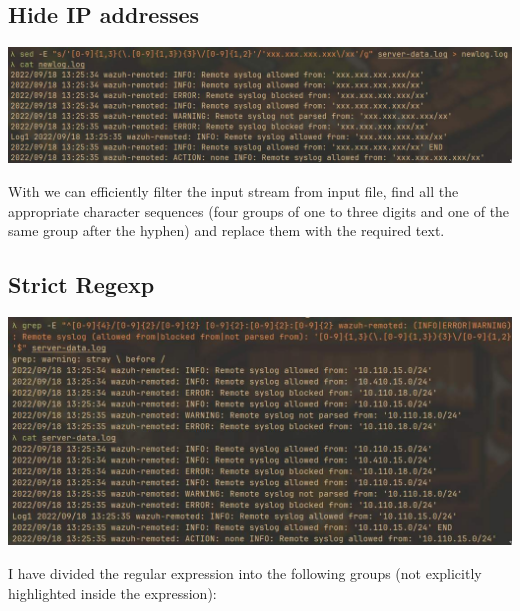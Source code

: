 \documentclass{article}
\begin{document}
\subsection{Hide IP addresses}
\label{sec:strict}
\noindent

\includegraphics[width=460pt]{3_2-4.jpg}
\newline

With  we can efficiently filter the input stream from input file, find all the appropriate character sequences (four groups of one to three digits and one of the same group after the hyphen) and replace them with the required text.

\subsection{Strict Regexp}

\noindent

\includegraphics[width=460pt]{3_2-5.jpg}
\newline

I have divided the regular expression into the following groups (not explicitly highlighted inside the expression):
\end{document}
